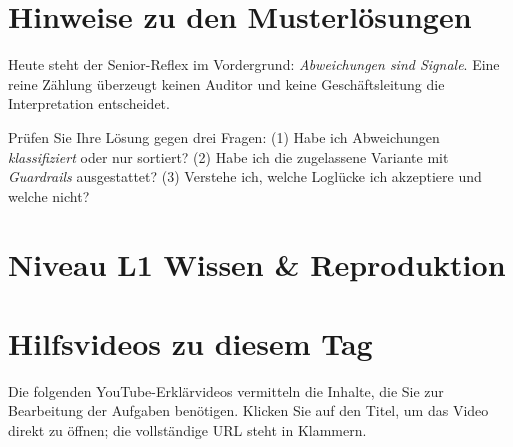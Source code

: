 \documentclass[11pt,a4paper,oneside]{article}
\begin{document}
\section*{Hinweise zu den Musterl\"osungen}
\thispagestyle{plain}

\noindent Heute steht der Senior-Reflex im Vordergrund: \emph{Abweichungen sind Signale}. Eine reine Z\"ahlung \"uberzeugt keinen Auditor und keine Gesch\"aftsleitung \textendash{} die Interpretation entscheidet.

\begin{infobox}
Pr\"ufen Sie Ihre L\"osung gegen drei Fragen: (1) Habe ich Abweichungen \emph{klassifiziert} oder nur sortiert? (2) Habe ich die zugelassene Variante mit \emph{Guardrails} ausgestattet? (3) Verstehe ich, welche Logl\"ucke ich akzeptiere und welche nicht?
\end{infobox}

\clearpage

\section*{Niveau L1 \textendash{} Wissen \& Reproduktion}

\section*{Hilfsvideos zu diesem Tag}
\thispagestyle{plain}

\noindent Die folgenden YouTube-Erkl\"arvideos vermitteln die Inhalte, die Sie zur Bearbeitung der Aufgaben ben\"otigen. Klicken Sie auf den Titel, um das Video direkt zu \"offnen; die vollst\"andige URL steht in Klammern.
\end{document}
